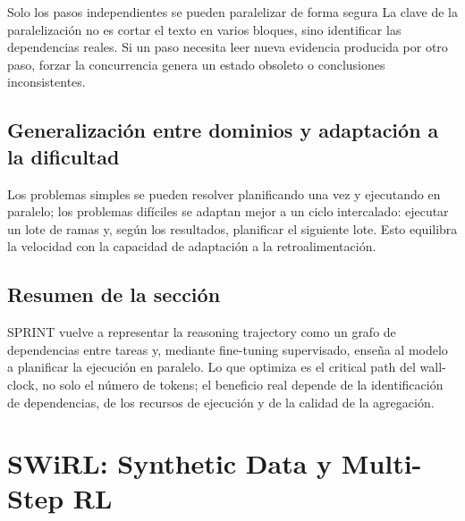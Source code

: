\documentclass[a4paper]{article}
\begin{document}
\begin{importantbox}{Solo los pasos independientes se pueden paralelizar de forma segura}
La clave de la paralelización no es cortar el texto en varios bloques, sino identificar las dependencias reales. Si un paso necesita leer nueva evidencia producida por otro paso, forzar la concurrencia genera un estado obsoleto o conclusiones inconsistentes.
\end{importantbox}

\subsection{Generalización entre dominios y adaptación a la dificultad}



Los problemas simples se pueden resolver planificando una vez y ejecutando en paralelo; los problemas difíciles se adaptan mejor a un ciclo intercalado: ejecutar un lote de ramas y, según los resultados, planificar el siguiente lote. Esto equilibra la velocidad con la capacidad de adaptación a la retroalimentación.


\subsection{Resumen de la sección}

SPRINT vuelve a representar la reasoning trajectory como un grafo de dependencias entre tareas y, mediante fine-tuning supervisado, enseña al modelo a planificar la ejecución en paralelo. Lo que optimiza es el critical path del wall-clock, no solo el número de tokens; el beneficio real depende de la identificación de dependencias, de los recursos de ejecución y de la calidad de la agregación.
\section{SWiRL: Synthetic Data y Multi-Step RL}
\end{document}
